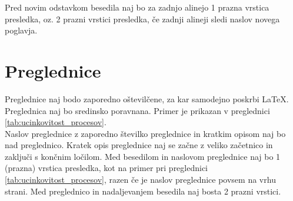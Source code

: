 Pred novim odstavkom besedila naj bo za zadnjo alinejo 1 prazna vrstica presledka, oz. 2 prazni vrstici presledka, če zadnji alineji sledi naslov novega poglavja.

\section{Preglednice}\label{sec:preglednice}

Preglednice naj bodo zaporedno oštevilčene, za kar samodejno poskrbi \LaTeX. Preglednica naj bo sredinsko poravnana. Primer je prikazan v preglednici \ref{tab:ucinkovitost_procesov}.\\

Naslov preglednice z zaporedno številko preglednice in kratkim opisom naj bo nad preglednico. Kratek opis preglednice naj se začne z veliko začetnico in zaključi s končnim ločilom. Med besedilom in naslovom preglednice naj bo 1 (prazna) vrstica presledka, kot na primer pri preglednici \ref{tab:ucinkovitost_procesov}, razen če je naslov preglednice povsem na vrhu strani. Med preglednico in nadaljevanjem besedila naj bosta 2 prazni vrstici.\\

